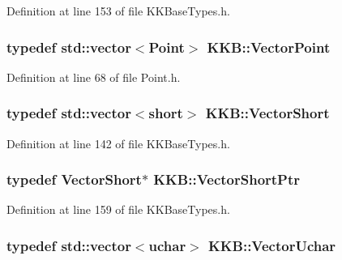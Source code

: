 Definition at line 153 of file K\+K\+Base\+Types.\+h.

\subsubsection[{\texorpdfstring{Vector\+Point}{VectorPoint}}]{\setlength{\rightskip}{0pt plus 5cm}typedef std\+::vector$<${\bf Point}$>$ {\bf K\+K\+B\+::\+Vector\+Point}}\hypertarget{namespace_k_k_b_a45768068a46dcf810be0a0f5a91627bb}{}\label{namespace_k_k_b_a45768068a46dcf810be0a0f5a91627bb}


Definition at line 68 of file Point.\+h.

\subsubsection[{\texorpdfstring{Vector\+Short}{VectorShort}}]{\setlength{\rightskip}{0pt plus 5cm}typedef std\+::vector$<$short$>$ {\bf K\+K\+B\+::\+Vector\+Short}}\hypertarget{namespace_k_k_b_a17d2c938216be2f3e37e982067fa7234}{}\label{namespace_k_k_b_a17d2c938216be2f3e37e982067fa7234}


Definition at line 142 of file K\+K\+Base\+Types.\+h.

\subsubsection[{\texorpdfstring{Vector\+Short\+Ptr}{VectorShortPtr}}]{\setlength{\rightskip}{0pt plus 5cm}typedef {\bf Vector\+Short}$\ast$ {\bf K\+K\+B\+::\+Vector\+Short\+Ptr}}\hypertarget{namespace_k_k_b_ab423dc7b2750fb78f63c613d0b94691b}{}\label{namespace_k_k_b_ab423dc7b2750fb78f63c613d0b94691b}


Definition at line 159 of file K\+K\+Base\+Types.\+h.

\subsubsection[{\texorpdfstring{Vector\+Uchar}{VectorUchar}}]{\setlength{\rightskip}{0pt plus 5cm}typedef std\+::vector$<${\bf uchar}$>$ {\bf K\+K\+B\+::\+Vector\+Uchar}}\hypertarget{namespace_k_k_b_a2e345982c9a919580d77a11178ad920a}{}\label{namespace_k_k_b_a2e345982c9a919580d77a11178ad920a}


